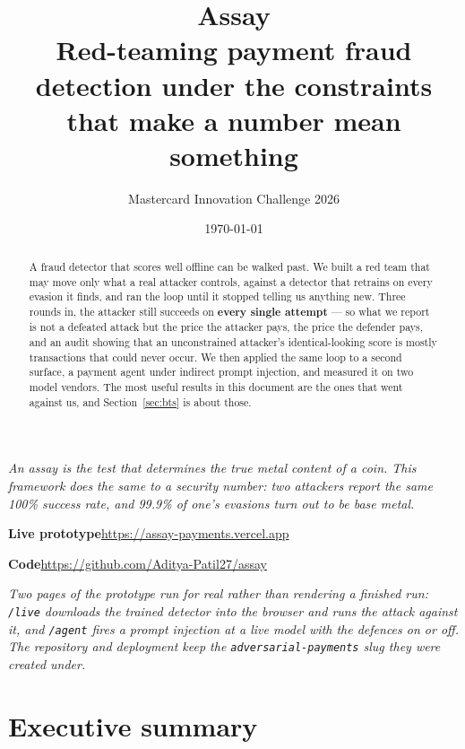 \documentclass[11pt,a4paper]{article}
\title{\vspace{-1.5cm}\textbf{Assay}\\[0.25cm]
\large Red-teaming payment fraud detection under the constraints
that make a number mean something}
\author{Mastercard Innovation Challenge 2026}
\date{\today}
\newcommand{\claim}[1]{\textcolor{attack}{\textbf{#1}}}
\begin{document}
\maketitle
\thispagestyle{empty}

\begin{abstract}
\noindent
A fraud detector that scores well offline can be walked past. We built a red team that may
move only what a real attacker controls, against a detector that retrains on every evasion
it finds, and ran the loop until it stopped telling us anything new. Three rounds in, the
attacker still succeeds on \claim{every single attempt} --- so what we report is not a
defeated attack but the price the attacker pays, the price the defender pays, and an audit
showing that an unconstrained attacker's identical-looking score is mostly transactions that
could never occur. We then applied the same loop to a second surface, a payment agent under
indirect prompt injection, and measured it on two model vendors. The most useful results in
this document are the ones that went against us, and Section~\ref{sec:bts} is about those.
\end{abstract}

\begin{center}
\small\itshape
An assay is the test that determines the true metal content of a coin. This framework
does the same to a security number: two attackers report the same 100\% success rate,
and 99.9\% of one's evasions turn out to be base metal.
\end{center}

\begin{center}
\small
\textbf{Live prototype}\quad \url{https://assay-payments.vercel.app}
\par\smallskip
\textbf{Code}\quad \url{https://github.com/Aditya-Patil27/assay}
\end{center}

\noindent
\small\emph{Two pages of the prototype run for real rather than rendering a finished run:
\texttt{/live} downloads the trained detector into the browser and runs the attack against
it, and \texttt{/agent} fires a prompt injection at a live model with the defences on or
off. The repository and deployment keep the \texttt{adversarial-payments} slug they were
created under.}\normalsize

\vspace{0.3cm}

\section{Executive summary}
\end{document}

